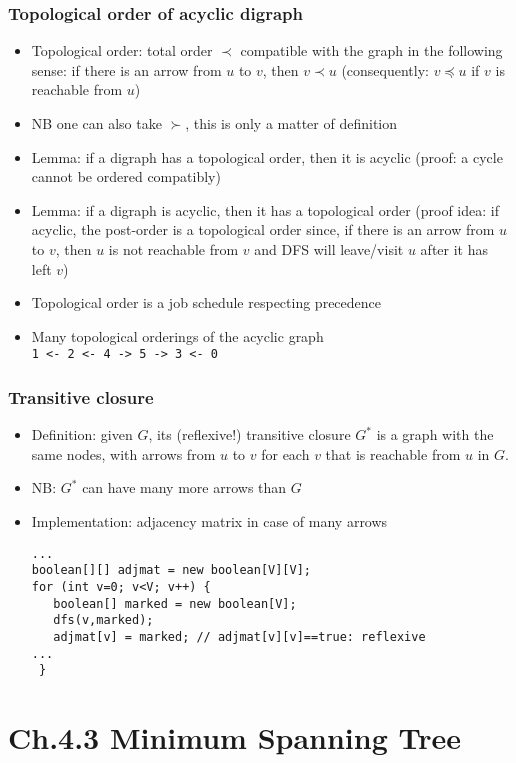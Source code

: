 \documentclass[handout]{beamer}
\begin{document}
\begin{frame}
    \frametitle{Topological order of acyclic digraph}

\begin{itemize}[<+->]
\item Topological order: total order $\prec$ 
compatible with the graph in the following sense:
if there is an arrow from $u$ to $v$, then $v\prec u$ 
(consequently: $v\preceq u$ if $v$ is reachable from $u$)
\item NB one can also take $\succ$, this is only a matter of definition
\item Lemma: if a digraph has a topological order, then it is acyclic
(proof: a cycle cannot be ordered compatibly)
\item Lemma: if a digraph is acyclic, then it has a topological order
(proof idea: if acyclic, the post-order is a topological order since,
if there is an arrow from $u$ to $v$, then $u$ is not reachable from $v$
and DFS will leave/visit $u$ after it has left $v$)
\item Topological order is a job schedule respecting precedence
\item Many topological orderings of the acyclic graph\\  {\tt 1 <- 2 <- 4 -> 5 -> 3 <- 0 }
\end{itemize}
\end{frame}

\begin{frame}[fragile]
    \frametitle{Transitive closure}

\begin{itemize}[<+->]
\item Definition: given $G$, its (reflexive!) transitive closure $G^*$ is a 
graph with the same nodes, with arrows from $u$ to $v$ for each $v$
that is reachable from $u$ in $G$.
\item NB: $G^*$ can have many more arrows than $G$
\item Implementation: adjacency matrix in case of many arrows
\begin{verbatim}
...
boolean[][] adjmat = new boolean[V][V];
for (int v=0; v<V; v++) {
   boolean[] marked = new boolean[V];
   dfs(v,marked);
   adjmat[v] = marked; // adjmat[v][v]==true: reflexive
...
 }    
\end{verbatim}  
\end{itemize}
\end{frame}

\section{Ch.4.3 Minimum Spanning Tree}
\end{document}
